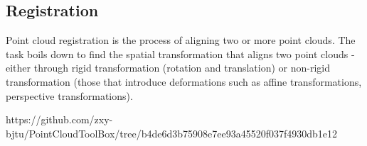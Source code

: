 \subsection{Registration}
Point cloud registration is the process of aligning two or more point clouds. The task boils down to find the spatial transformation that aligns two point clouds - either through rigid transformation (rotation and translation) or non-rigid transformation (those that introduce deformations such as affine transformations, perspective transformations).

https://github.com/zxy-bjtu/PointCloudToolBox/tree/b4de6d3b75908e7ee93a45520f037f4930db1e12

\nocite{*}




